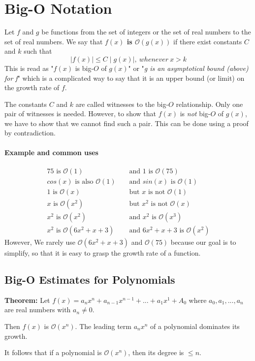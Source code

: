 \documentclass[10pt,a4paper]{book}
\begin{document}
\section{Big-O Notation}
Let $f$ and $g$ be functions from the set of integers or the set of real numbers to the set of real numbers. We say that \textbf{$f(x)$ is $\mathcal{O}(g(x))$} if there exist constants $C$ and $k$ such that
\[\mid f(x)\mid \leq C\mid g(x)\mid,\ whenever\ x>k\] 
This is read as "$f(x)$ is big-$O$ of $g(x)$" or "\textit{g is an asymptotical bound (above) for f}" which is a complicated way to say that it is an upper bound (or limit) on the growth rate of $f$.\par
The constants $C$ and $k$ are called witnesses to the big-$O$ relationship. Only one pair of witnesses is needed. However, to show that $f(x)$ is \textit{not} big-$O$ of $g(x)$, we have to show that we cannot find such a pair. This can be done using a proof by contradiction.
\paragraph*{Example and common uses}
\begin{align*}
&75 \text{ is } \mathcal{O}(1) &&\text{ and }1\text{ is }\mathcal{O}(75)\\
&cos(x)\text{ is also }\mathcal{O}(1)&&\text{ and }sin(x)\text{ is }\mathcal{O}(1)\\
&1\text{ is }\mathcal{O}(x) &&\text{ but }x\text{ is not }\mathcal{O}(1)\\
&x\text{ is }\mathcal{O}(x^2) &&\text{ but }x^2\text{ is not }\mathcal{O}(x)\\
&x^2\text{ is }\mathcal{O}(x^2) &&\text{ and }x^2\text{ is }\mathcal{O}(x^3)\\
&x^2\text{ is }\mathcal{O}(6x^2+x+3) &&\text{ and }6x^2+x+3\text{ is }\mathcal{O}(x^2)&
\end{align*}
However, We rarely use $\mathcal{O}(6x^2+x+3)$ and $\mathcal{O}(75)$ because our goal is to simplify, so that it is easy to grasp the growth rate of a function.
\subsection{Big-O Estimates for Polynomials}
$\ $\\
\textbf{Theorem:} Let $f(x)=a_nx^n+a_{n-1}x^{n-1}+...+a_1x^1+A_0$ where $a_0,a_1,...,a_n$ are real numbers with $a_n \neq 0$.\par 
Then $f(x)$ is $\mathcal{O}(x^n)$. The leading term $a_nx^n$ of a polynomial dominates its growth.\par
It follows that if a polynomial is $\mathcal{O}(x^n)$, then its degree is $\leqslant n$.
\end{document}
